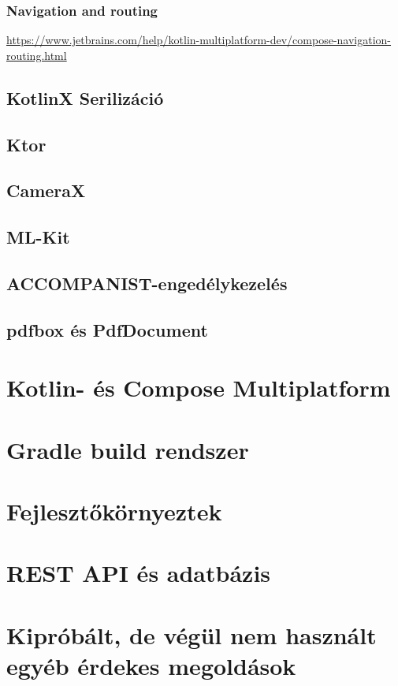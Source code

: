 \subsubsection{Navigation and routing}
\url{https://www.jetbrains.com/help/kotlin-multiplatform-dev/compose-navigation-routing.html}


\subsection{KotlinX Serilizáció}

\subsection{Ktor}

\subsection{CameraX}

\subsection{ML-Kit}

\subsection{ACCOMPANIST-engedélykezelés}

\subsection{pdfbox és PdfDocument}

\section{Kotlin- és Compose Multiplatform}

\section{Gradle build rendszer}

\section{Fejlesztőkörnyeztek}

\section{REST API és adatbázis}

\section{Kipróbált, de végül nem használt egyéb érdekes megoldások}